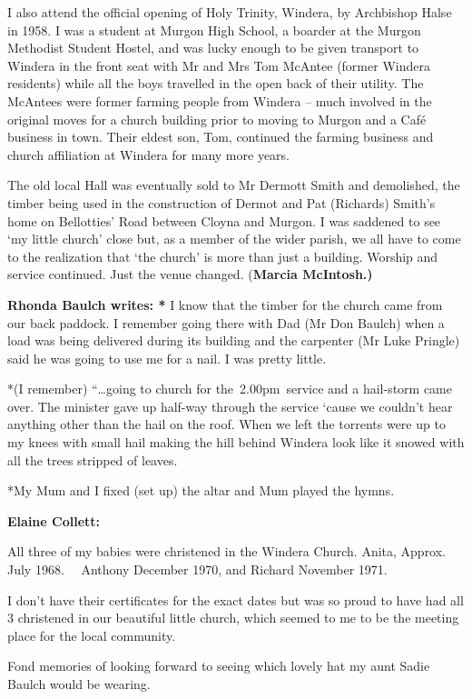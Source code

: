 I also attend the official opening of Holy Trinity, Windera, by Archbishop Halse in 1958. I was a student at Murgon High School, a boarder at the Murgon Methodist Student Hostel, and was lucky enough to be given transport to Windera in the front seat with Mr and Mrs Tom McAntee (former Windera residents) while all the boys travelled in the open back of their utility. The McAntees were former farming people from Windera -- much involved in the original moves for a church building prior to moving to Murgon and a Café business in town. Their eldest son, Tom, continued the farming business and church affiliation at Windera for many more years.

The old local Hall was eventually sold to Mr Dermott Smith and demolished, the timber being used in the construction of Dermot and Pat (Richards) Smith's home on Bellotties' Road between Cloyna and Murgon. I was saddened to see `my little church' close but, as a member of the wider parish, we all have to come to the realization that `the church' is more than just a building. Worship and service continued. Just the venue changed. (\textbf{Marcia McIntosh.)}

\textbf{Rhonda Baulch writes: *} I know that the timber for the church came from our back paddock. I remember going there with Dad (Mr Don Baulch) when a load was being delivered during its building and the carpenter (Mr Luke Pringle) said he was going to use me for a nail. I was pretty little.

*(I remember) ``\ldots going to church for the~2.00pm~service and a hail-storm came over. The minister gave up half-way through the service `cause we couldn't hear anything other than the hail on the roof. When we left the torrents were up to my knees with small hail making the hill behind Windera look like it snowed with all the trees stripped of leaves.

*My Mum and I fixed (set up) the altar and Mum played the hymns.

\textbf{Elaine Collett:}

All three of my babies were christened in the Windera Church. Anita, Approx. July 1968.~~ Anthony December 1970, and Richard November 1971.

I don't have their certificates for the exact dates but was so proud to have had all 3 christened in our beautiful little church, which seemed to me to be the meeting place for the local community.

Fond memories of looking forward to seeing which lovely hat my aunt Sadie Baulch would be wearing.

